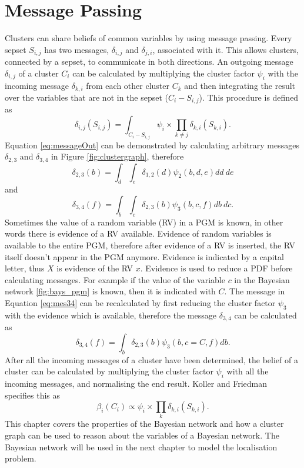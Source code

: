 \documentclass[12pt,oneside,openany,a4paper, %
afrikaans,english,
]{memoir}
\numberwithin{equation}{chapter}
\begin{document}
{\section{Message Passing}
Clusters can share beliefs of common variables by using message passing. Every sepset $S_{i,j}$ has two messages, $\delta_{i, j}$ and $\delta_{j,i}$, associated with it. This allows clusters, connected by a sepset, to communicate in both directions. An outgoing message $\delta_{i,j}$ of a cluster $C_i$ can be calculated by multiplying the cluster factor $\psi_i$ with the incoming message $\delta_{k,i}$ from each other cluster $C_k$ and then integrating the result over the variables that are not in the sepset ($C_i - S_{i,j}$). This procedure is defined as~\citep{koller}
\begin{equation}\label{eq:messageOut}
\delta_{i,j}(S_{i,j}) = \int_{C_i - S_{i,j}}\psi_i \times \prod_{k\ne j} \delta_{k,i}(S_{k,i}).
\end{equation}
Equation \ref{eq:messageOut} can be demonstrated by calculating arbitrary messages $\delta_{2,3}$ and $\delta_{3,4}$ in Figure \ref{fig:clustergraph}, therefore
\begin{equation}
\delta_{2,3}(b) = \int_d \int_e \delta_{1,2}(d)\psi_2(b,d,e)dd\ de
\end{equation}
and
\begin{equation}\label{eq:mes34}
\delta_{3,4}(f) = \int_b \int_c \delta_{2,3}(b)\psi_3(b,c,f)db\ dc.
\end{equation}
Sometimes the value of a random variable (RV) in a PGM is known, in other words there is evidence of a RV available. Evidence of random variables is available to the entire PGM, therefore after evidence of a RV is inserted, the RV itself doesn't appear in the PGM anymore. Evidence is indicated by a capital letter, thus $X$ is evidence of the RV $x$. Evidence is used to reduce a PDF before calculating messages. For example if the value of the variable $c$ in the Bayesian network \ref{fig:bays_pgm} is known, then it is indicated with $C$. The message in Equation \ref{eq:mes34} can be recalculated by first reducing the cluster factor $\psi_3$ with the evidence which is available, therefore the message $\delta_{3,4}$ can be calculated as
\begin{equation}
\delta_{3,4}(f) = \int_b \delta_{2,3}(b)\psi_3(b,c =C,f)db.
\end{equation}
After all the incoming messages of a cluster have been determined, the belief of a cluster can be calculated by multiplying the cluster factor $\psi_i$ with all the incoming messages, and normalising the end result. Koller and Friedman~\cite{koller} specifies this as
\begin{equation}
\beta_i(C_i) \propto \psi_i \times \prod_{k} \delta_{k , i}(S_{k,i}).
\end{equation}
This chapter covers the properties of the Bayesian network and how a cluster graph can be used to reason about the variables of a Bayesian network. The Bayesian network will be used in the next chapter to model the localisation problem.
}
\end{document}
